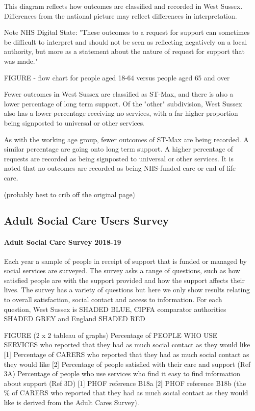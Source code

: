 This diagram reflects how outcomes are classified and recorded in West Sussex. Differences from the national picture may reflect differences in interpretation.

Note NHS Digital State: "These outcomes to a request for support can sometimes be difficult to interpret and should not be seen as reflecting negatively on a local authority, but more as a statement about the nature of request for support that was made."

FIGURE - flow chart for people aged 18-64 versus people aged 65 and over

Fewer outcomes in West Sussex are classified as ST-Max, and there is also a lower percentage of long term support. Of the "other" subdivision, West Sussex also has a lower percentage receiving no services, with a far higher proportion being signposted to universal or other services.

As with the working age group, fewer outcomes of ST-Max are being recorded. A similar percentage are going onto long term support. A higher percentage of requests are recorded as being signposted to universal or other services. It is noted that no outcomes are recorded as being NHS-funded care or end of life care.

(probably best to crib off the original page)

\subsection{Adult Social Care Users Survey}
\paragraph{Adult Social Care Survey 2018-19} Each year a sample of people in receipt of support that is funded or managed by social services are surveyed. The survey asks a range of questions, such as how satisfied people are with the support provided and how the support affects their lives. The survey has a variety of questions but here we only show results relating to overall satisfaction, social contact and access to information. For each question, West Sussex is SHADED BLUE, CIPFA comparator authorities SHADED GREY and England SHADED RED

FIGURE (2 x 2 tableau of graphs)
Percentage of PEOPLE WHO USE SERVICES who reported that they had as much social contact as they would like [1]
Percentage of CARERS who reported that they had as much social contact as they would like [2]
Percentage of people satisfied with their care and support (Ref 3A)
Percentage of people who use services who find it easy to find information about support (Ref 3D)
[1] PHOF reference B18a [2] PHOF reference B18b (the \% of CARERS who reported that they had as much social contact as they would like is derived from the Adult Cares Survey).
